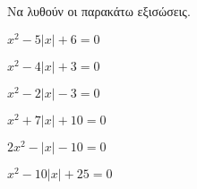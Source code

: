 Να λυθούν οι παρακάτω εξισώσεις.
\begin{multicols}{2}
\begin{alist}[leftmargin=3mm]
\item $ x^2-5\left|x\right|+6=0 $
\item $ x^2-4\left|x\right|+3=0 $
\item $ x^2-2\left|x\right|-3=0 $
\item $ x^2+7\left|x\right|+10=0 $
\item $ 2x^2-\left|x\right|-10=0 $
\item $ x^2-10\left|x\right|+25=0 $
\end{alist}
\end{multicols}
